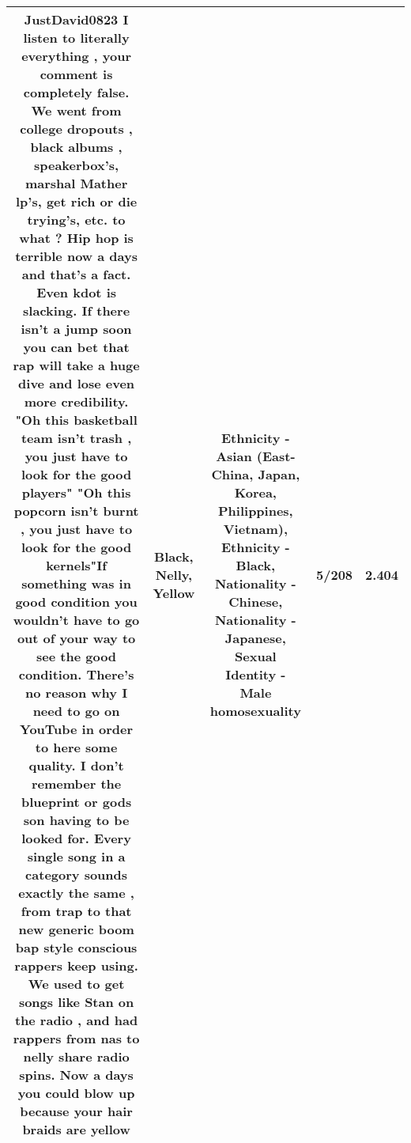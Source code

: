 \documentclass[11pt]{article}
\newlength\mylength
\begin{document}
\begin{center}
\begin{longtable}{|C{.65\mylength}|C{.30\mylength}|C{.12\mylength}|C{.12\mylength}|C{.12\mylength}|}
  \small JustDavid0823 I listen to literally everything , your comment is completely false. We went from college dropouts , \textbf{black} albums , speakerbox's, marshal Mather lp's, get rich or die trying's, etc. to what ? Hip hop is terrible now a days and that's a fact. Even kdot is slacking. If there isn't a jump soon you can bet that rap will take a huge dive and lose even more credibility. "Oh this basketball team isn't trash , you just have to look for the good players" "Oh this popcorn isn't burnt , you just have to look for the good kernels"If something was in good condition you wouldn't have to go out of your way to see the good condition. There's no reason why I need to go on YouTube in order to here some quality. I don't remember the blueprint or gods son having to be looked for. Every single song in a category sounds exactly the same , from trap to that new generic boom bap style conscious rappers keep using. We used to get songs like Stan on the radio , and had rappers from nas to \textbf{nelly} share radio spins. Now a days you could blow up because your hair braids are yellow\normalsize   & Black, Nelly, Yellow & Ethnicity - Asian (East- China, Japan, Korea, Philippines, Vietnam), Ethnicity - Black, Nationality - Chinese, Nationality - Japanese, Sexual Identity - Male homosexuality & 5/208 & 2.404 \\  \hline

\end{longtable}
\end{center}
\end{document}
